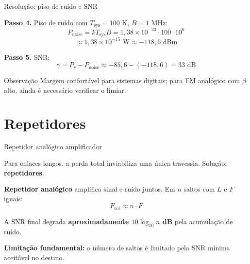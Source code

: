 
\begin{frame}{Resolução: piso de ruído e SNR}

\textbf{Passo 4.} Piso de ruído com $T_{\text{sys}} = 100$ K, $B = 1$ MHz:
\[
P_{\text{noise}} = k T_{\text{sys}} B = 1{,}38\times 10^{-23} \cdot 100 \cdot 10^{6}
\]
\[
\approx 1{,}38\times 10^{-15} \text{ W} \approx -118{,}6 \text{ dBm}
\]

\textbf{Passo 5.} SNR:
\[
\gamma = P_r - P_{\text{noise}} \approx -85{,}6 - (-118{,}6) = 33 \text{ dB}
\]

\begin{block}{Observação}
Margem confortável para sistemas digitais; para FM analógico com $\beta$ alto, ainda é necessário verificar o limiar.
\end{block}

\end{frame}


\section{Repetidores}

\begin{frame}{Repetidor analógico amplificador}

Para enlaces longos, a perda total inviabiliza uma única travessia. Solução: \textbf{repetidores}.

\vspace{0.3cm}

\textbf{Repetidor analógico} amplifica sinal e ruído juntos. Em $n$ saltos com $L$ e $F$ iguais:
\[
F_{\text{tot}} \approx n \cdot F
\]

A SNR final degrada \textbf{aproximadamente $10\log_{10} n$ dB} pela acumulação de ruído.

\vspace{0.3cm}

\textbf{Limitação fundamental:} o número de saltos é limitado pela SNR mínima aceitável no destino.

\end{frame}


